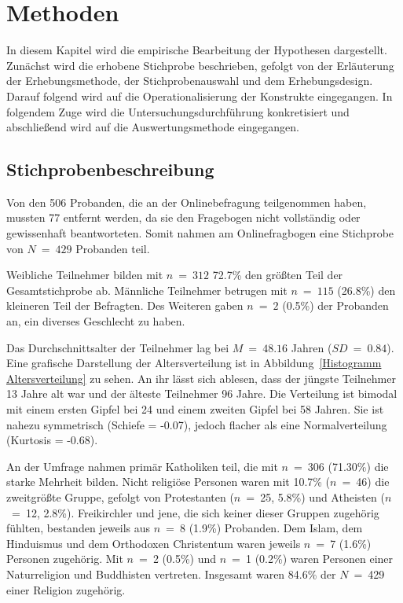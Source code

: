 \chapter{Methoden}   \label{ch_3}
In diesem Kapitel wird die empirische Bearbeitung der Hypothesen dargestellt. Zunächst wird die erhobene Stichprobe beschrieben, gefolgt von der Erläuterung der Erhebungsmethode, der Stichprobenauswahl und dem Erhebungsdesign. Darauf folgend wird auf die Operationalisierung der Konstrukte eingegangen. In folgendem Zuge wird die Untersuchungsdurchführung konkretisiert und abschließend wird auf die Auswertungsmethode eingegangen.

\section{Stichprobenbeschreibung} \label{sec_3.1}
Von den 506 Probanden, die an der Onlinebefragung teilgenommen haben, mussten 77 entfernt werden, da sie den Fragebogen nicht vollständig oder gewissenhaft beantworteten. Somit nahmen am Onlinefragbogen eine Stichprobe von $N~=~429$ Probanden teil. 

Weibliche Teilnehmer bilden mit $n~=~312$ 72.7\% den größten Teil der Gesamtstichprobe ab. Männliche Teilnehmer betrugen mit $n~=~115$ (26.8\%) den kleineren Teil der Befragten. Des Weiteren gaben $n~=~2$ (0.5\%) der Probanden an, ein diverses Geschlecht zu haben. 


Das Durchschnittsalter der Teilnehmer lag bei $M~=~48.16$ Jahren ($SD~=~0.84$). Eine grafische Darstellung der Altersverteilung ist in Abbildung~\ref{Histogramm Altersverteilung} zu sehen. An ihr lässt sich ablesen, dass der jüngste Teilnehmer 13 Jahre alt war und der älteste Teilnehmer 96 Jahre. Die Verteilung ist bimodal mit einem ersten Gipfel bei 24 und einem zweiten Gipfel bei 58 Jahren. Sie ist nahezu symmetrisch (Schiefe = -0.07), jedoch flacher als eine Normalverteilung (Kurtosis = -0.68). 

An der Umfrage nahmen primär Katholiken teil, die mit $n$~=~306 (71.30\%) die starke Mehrheit bilden. Nicht religiöse Personen waren mit 10.7\% ($n$~=~46) die zweitgrößte Gruppe, gefolgt von Protestanten ($n$~=~25, 5.8\%) und Atheisten ($n$~=~12, 2.8\%). Freikirchler und jene, die sich keiner dieser Gruppen zugehörig fühlten, bestanden jeweils aus $n$~=~8 (1.9\%) Probanden. Dem Islam, dem Hinduismus und dem Orthodoxen Christentum waren jeweils $n$~=~7 (1.6\%) Personen zugehörig. Mit $n$~=~2 (0.5\%) und $n$~=~1 (0.2\%) waren Personen einer Naturreligion und Buddhisten vertreten. Insgesamt waren 84.6\% der $N$~=~429 einer Religion zugehörig. 


